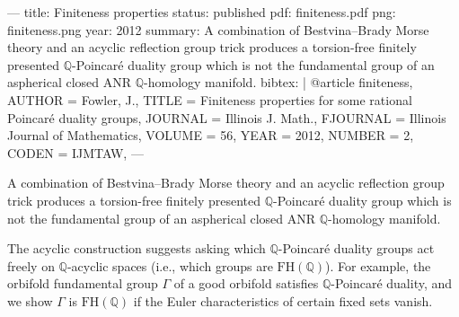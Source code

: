 ---
title: Finiteness properties
status: published
pdf: finiteness.pdf
png: finiteness.png
year: 2012
summary: A combination of Bestvina--Brady Morse theory and an acyclic reflection group trick produces a torsion-free finitely presented $\mathbb{Q}$-Poincar\'e duality group which is not the fundamental group of an aspherical closed ANR $\mathbb{Q}$-homology manifold.
bibtex: |
  @article {finiteness,
  AUTHOR = {Fowler, J.},
  TITLE = {Finiteness properties for some rational {P}oincar\'e duality groups},
  JOURNAL = {Illinois J. Math.},
  FJOURNAL = {Illinois Journal of Mathematics},
  VOLUME = {56},
  YEAR = {2012},
  NUMBER = {2},
  CODEN = {IJMTAW},
  }
---

A combination of Bestvina--Brady Morse theory and an acyclic reflection group trick produces a torsion-free finitely presented $\mathbb{Q}$-Poincar\'e duality group which is not the fundamental group of an aspherical closed ANR $\mathbb{Q}$-homology manifold.

The acyclic construction suggests asking which $\mathbb{Q}$-Poincar\'e duality groups act freely on $\mathbb{Q}$-acyclic spaces (i.e., which groups are $\mbox{FH}(\mathbb{Q})$).  For example, the orbifold fundamental group $\Gamma$ of a good orbifold satisfies $\mathbb{Q}$-Poincar\'e duality, and we show $\Gamma$ is $\mbox{FH}(\mathbb{Q})$ if the Euler characteristics of certain fixed sets vanish.
